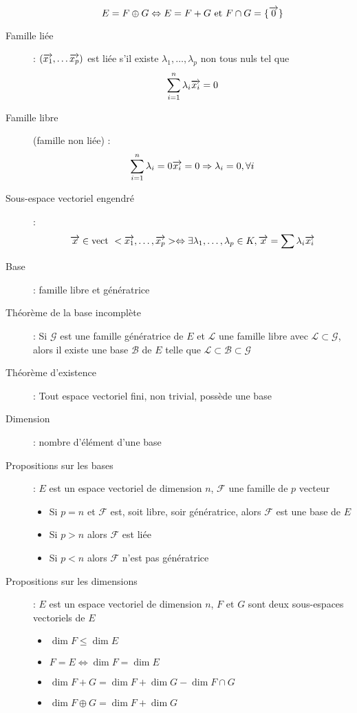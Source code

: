 \begin{description}
    \[ E=F\oplus G\Leftrightarrow E=F+G\textrm{ et }F\cap G=\{\overrightarrow{0}\} \]
\item[Famille liée] : $(\overrightarrow{x_1},\dots\overrightarrow{x_p})$ est liée s'il existe $\lambda_1,\dots,\lambda_p$ non tous nuls tel que
    \[ \sum_{i=1}^n\lambda_i\overrightarrow{x_i}=0 \]
\item[Famille libre] (famille non liée) :
    \[ \sum_{i=1}^n\lambda_i=0\overrightarrow{x_i}=0\Rightarrow\lambda_i=0,\forall i \]
\item[Sous-espace vectoriel engendré] :
    \[ \overrightarrow{x}\in\textrm{vect }<\overrightarrow{x_1},\dots,\overrightarrow{x_p}>\Leftrightarrow\exists\lambda_1,\dots,\lambda_p\in K,\overrightarrow{x}=\sum\lambda_i\overrightarrow{x_i} \]
\item[Base] : famille libre et génératrice
\item[Théorème de la base incomplète] : Si $\mathcal G$ est une famille génératrice de $E$ et $\mathcal L$
    une famille libre avec $\mathcal L\subset\mathcal G$, alors il existe une base $\mathcal B$
    de $E$ telle que $\mathcal L\subset\mathcal B\subset\mathcal G$
\item[Théorème d'existence] : Tout espace vectoriel fini, non trivial, possède une base
\item[Dimension] : nombre d'élément d'une base
\item[Propositions sur les bases] : $E$ est un espace vectoriel de dimension $n$, $\mathcal F$ une famille de $p$ vecteur
\begin{itemize}
    \item Si $p=n$ et $\mathcal F$ est, soit libre, soir génératrice, alors $\mathcal F$ est une base de $E$
    \item Si $p>n$ alors $\mathcal F$ est liée
    \item Si $p<n$ alors $\mathcal F$ n'est pas génératrice
\end{itemize}
\item[Propositions sur les dimensions] : $E$ est un espace vectoriel de dimension $n$, $F$ et $G$ sont deux sous-espaces vectoriels de $E$
\begin{itemize}
    \item $\dim F\le\dim E$
    \item $F=E\Leftrightarrow\dim F=\dim E$
    \item $\dim F+G=\dim F+\dim G-\dim F\cap G$
    \item $\dim F\oplus G=\dim F+\dim G$
\end{itemize}
\end{description}